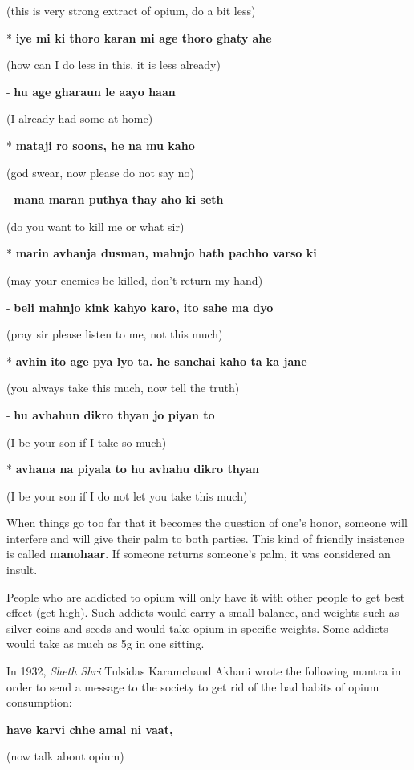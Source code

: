 (this is very strong extract of opium, do a bit less)

* \textbf{iye mi ki thoro karan mi age thoro ghaty ahe}

(how can I do less in this, it is less already)

- \textbf{hu age gharaun le aayo haan}

(I already had some at home)

* \textbf{mataji ro soons, he na mu kaho}

(god swear, now please do not say no)

- \textbf{mana maran puthya thay aho ki seth}

(do you want to kill me or what sir)

* \textbf{marin avhanja dusman, mahnjo hath pachho varso ki}

(may your enemies be killed, don't return my hand)

- \textbf{beli mahnjo kink kahyo karo, ito sahe ma dyo}

(pray sir please listen to me, not this much)

* \textbf{avhin ito age pya lyo ta. he sanchai kaho ta ka jane}

(you always take this much, now tell the truth)

- \textbf{hu avhahun dikro thyan jo piyan to}

(I be your son if I take so much)

* \textbf{avhana na piyala to hu avhahu dikro thyan}

(I be your son if I do not let you take this much)

When things go too far that it becomes the question of one's honor, someone
will interfere and will give their palm to both parties. This kind of friendly
insistence is called \textbf{manohaar}. If someone returns someone's palm, it
was considered an insult.

People who are addicted to opium will only have it with other people to get
best effect (get high). Such addicts would carry a small balance, and weights
such as silver coins and seeds and would take opium in specific weights. Some
addicts would take as much as 5g in one sitting.

In 1932, \textit{Sheth Shri} Tulsidas Karamchand Akhani wrote the following
mantra in order to send a message to the society to get rid of the bad habits
of opium consumption:

\textbf{have karvi chhe amal ni vaat,}

(now talk about opium)

